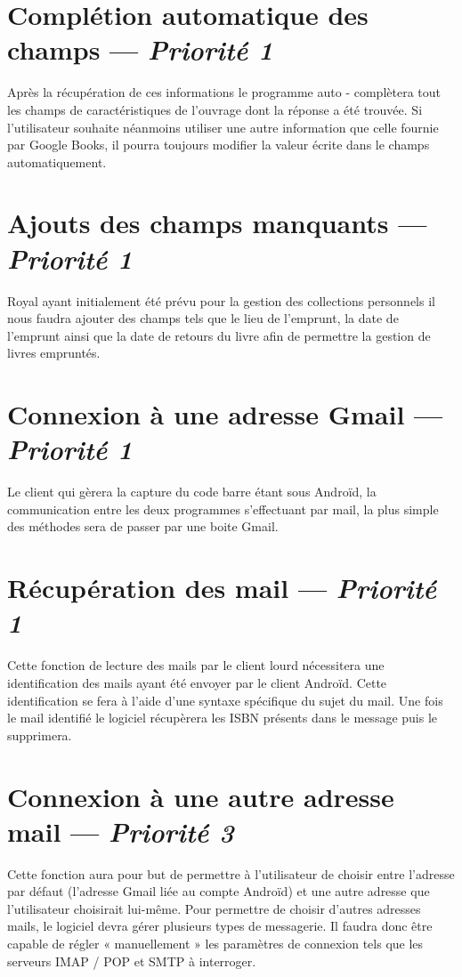 \section[Complétion automatique des champs]{Complétion automatique des champs — \emph{Priorité 1}}
Après la récupération de ces informations le programme auto - complètera tout les champs de caractéristiques de l'ouvrage dont la réponse a été trouvée.
Si l'utilisateur souhaite néanmoins utiliser une autre information que celle fournie par Google Books, il pourra toujours modifier la valeur écrite dans le champs automatiquement.

\section[Ajouts des champs manquants]{Ajouts des champs manquants — \emph{Priorité 1}}
Royal ayant initialement été prévu pour la gestion des collections personnels il nous faudra ajouter des champs tels que le lieu de l'emprunt, la date de l'emprunt ainsi que la date de retours du livre afin de permettre la gestion de livres empruntés. 

\section[Connexion à une adresse Gmail]{Connexion à une adresse Gmail — \emph{Priorité 1}} 
Le client qui gèrera la capture du code barre étant sous Androïd, la communication entre les deux programmes s'effectuant par mail, la plus simple des méthodes sera de passer par une boite Gmail.

\section[Récupération des mails]{Récupération des mail — \emph{Priorité 1}} 
Cette fonction de lecture des mails par le client lourd nécessitera une identification des mails ayant été envoyer par le client Androïd. 
Cette identification se fera à l'aide d'une syntaxe spécifique du sujet du mail. Une fois le mail identifié le logiciel récupèrera les ISBN présents dans le message puis le supprimera.  




\section[Connexion à une autre adresse mail]{Connexion à une autre adresse mail — \emph{Priorité 3}}
Cette fonction aura pour but de permettre à l'utilisateur de choisir entre l'adresse par défaut (l'adresse Gmail liée au compte Androïd) et une autre adresse que l'utilisateur choisirait lui-même. 
Pour permettre de choisir d'autres adresses mails, le logiciel devra gérer plusieurs types de messagerie.
Il faudra donc être capable de régler « manuellement » les paramètres de connexion tels que les serveurs IMAP / POP et SMTP à interroger.

